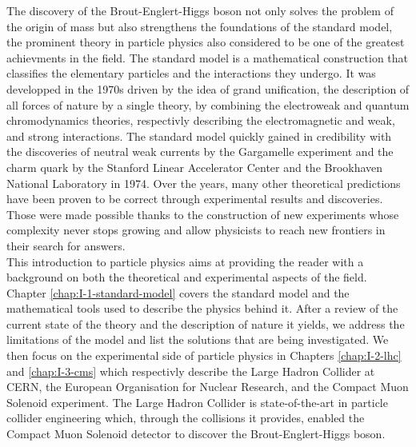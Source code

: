 The discovery of the Brout-Englert-Higgs boson not only solves the problem of the origin of mass but also strengthens the foundations of the standard model, the prominent theory in particle physics also considered to be one of the greatest achievments in the field. The standard model is a mathematical construction that classifies the elementary particles and the interactions they undergo. It was developped in the 1970s driven by the idea of grand unification, the description of all forces of nature by a single theory, by combining the electroweak and quantum chromodynamics theories, respectivly describing the electromagnetic and weak, and strong interactions. The standard model quickly gained in credibility with the discoveries of neutral weak currents by the Gargamelle experiment and the charm quark by the Stanford Linear Accelerator Center and the Brookhaven National Laboratory in 1974. Over the years, many other theoretical predictions have been proven to be correct through experimental results and discoveries. Those were made possible thanks to the construction of new experiments whose complexity never stops growing and allow physicists to reach new frontiers in their search for answers. \\

This introduction to particle physics aims at providing the reader with a background on both the theoretical and experimental aspects of the field. Chapter \ref{chap:I-1-standard-model} covers the standard model and the mathematical tools used to describe the physics behind it. After a review of the current state of the theory and the description of nature it yields, we address the limitations of the model and list the solutions that are being investigated. We then focus on the experimental side of particle physics in Chapters \ref{chap:I-2-lhc} and \ref{chap:I-3-cms} which respectivly describe the Large Hadron Collider at CERN, the European Organisation for Nuclear Research, and the Compact Muon Solenoid experiment. The Large Hadron Collider is state-of-the-art in particle collider engineering which, through the collisions it provides, enabled the Compact Muon Solenoid detector to discover the Brout-Englert-Higgs boson.
